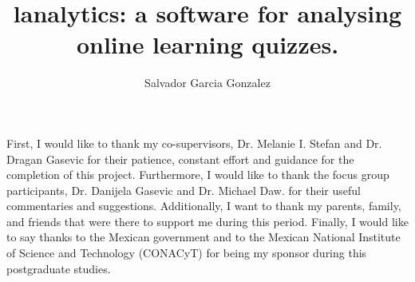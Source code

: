 \documentclass[msc, deptreport, logo, ds]{infthesis}
\title{lanalytics: a software for analysing online learning quizzes.}
\author{Salvador Garcia Gonzalez}
\begin{document}
\begin{preliminary}

\maketitle

\begin{acknowledgements}
First, I would like to thank my co-supervisors, Dr. Melanie I. Stefan and Dr. Dragan Gasevic for their patience, constant effort and guidance for the completion of this project. Furthermore, I would like to thank the focus group participants, Dr. Danijela Gasevic and Dr. Michael Daw. for their useful commentaries and suggestions. Additionally, I want to thank my parents, family, and friends that were there to support me during this period. Finally, I would like to say thanks to the Mexican government and to the Mexican National Institute of Science and Technology (CONACyT) for being my sponsor during this postgraduate studies.
\end{acknowledgements}

\standarddeclaration


\tableofcontents

\end{preliminary}









\appendix









\end{document}
